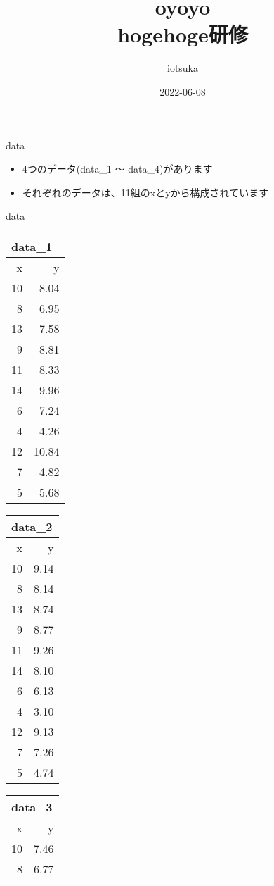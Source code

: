 \documentclass[
  ignorenonframetext,
]{beamer}
\title{oyoyo\\
hogehoge研修}
\author{iotsuka}
\date{2022-06-08}
\begin{document}
\frame{\titlepage}

\begin{frame}{data}
\protect\hypertarget{data}{}
\begin{itemize}[<+->]
\item
  4つのデータ(data\_1 ～ data\_4)があります
\item
  それぞれのデータは、11組のxとyから構成されています
\end{itemize}
\end{frame}

\begin{frame}{data}
\protect\hypertarget{data-1}{}
\begin{tabular}{rr}
\multicolumn{2}{l}{data\_1}\\
\toprule
x & y\\
\midrule
10 & 8.04\\
8 & 6.95\\
13 & 7.58\\
9 & 8.81\\
11 & 8.33\\
14 & 9.96\\
6 & 7.24\\
4 & 4.26\\
12 & 10.84\\
7 & 4.82\\
5 & 5.68\\
\bottomrule
\end{tabular}\hfill
\begin{tabular}{rr}
\multicolumn{2}{l}{data\_2}\\
\toprule
x & y\\
\midrule
10 & 9.14\\
8 & 8.14\\
13 & 8.74\\
9 & 8.77\\
11 & 9.26\\
14 & 8.10\\
6 & 6.13\\
4 & 3.10\\
12 & 9.13\\
7 & 7.26\\
5 & 4.74\\
\bottomrule
\end{tabular}\hfill
\begin{tabular}{rr}
\multicolumn{2}{l}{data\_3}\\
\toprule
x & y\\
\midrule
10 & 7.46\\
8 & 6.77\\

\end{tabular}
\end{frame}
\end{document}
